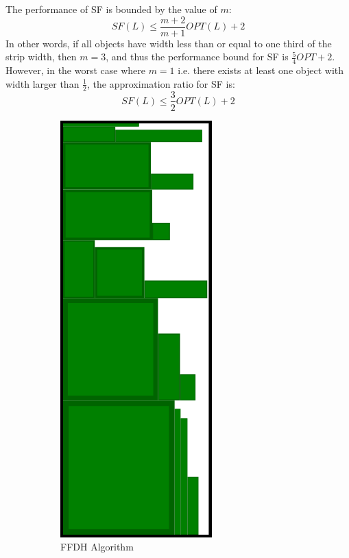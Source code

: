\documentclass{article}
\begin{document}
The performance of SF is bounded by the value of $m$:
\[
	SF(L) \leq \frac{m+2}{m+1}OPT(L) + 2
\]
In other words, if all objects have width less than or equal to one third of the strip width, then $m = 3$, and thus the performance bound for SF is $\frac{5}{4}OPT + 2$. However, in the worst case where $m = 1$ i.e. there exists at least one object with width larger than $\frac{1}{2}$, the approximation ratio for SF is:
\[
	SF(L) \leq \frac{3}{2}OPT(L) + 2
\]
\begin{figure}[ht]
\centering
\begin{subfigure}[b]{.35\textwidth}
  \centering
  \includegraphics[width=.5\linewidth]{FFDHrun.png}
  \caption{FFDH Algorithm}
  \label{fig:ffdhrun}
\end{subfigure}%
\begin{subfigure}[b]{.35\textwidth}
  \centering

\end{subfigure}
\end{figure}
\end{document}
